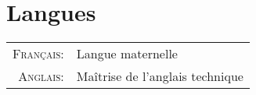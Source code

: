 \section{\texorpdfstring{\color{Blue}Langues}{Langues}}
\begin{tabular}{rl}
 \parbox{\datebox}{\raggedleft\textsc{Français:}}&Langue maternelle\\
\textsc{Anglais:}&Maîtrise de l'anglais technique\\
\end{tabular}